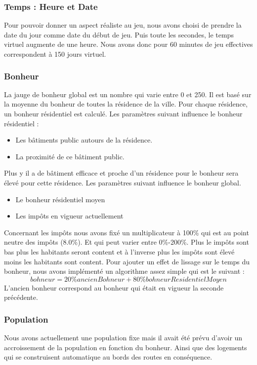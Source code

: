 \documentclass[a4paper,10pt,openany,oneside]{report}
\begin{document}
\subsubsection{Temps : Heure et Date}
Pour pouvoir donner un aspect réaliste au jeu, nous avons choisi de prendre la date du jour comme date du début de jeu. Puis toute les secondes, le temps virtuel augmente de une heure. Nous avons donc pour 60 minutes de jeu effectives correspondent à 150 jours virtuel.

\subsubsection{Bonheur}
La jauge de bonheur global est un nombre qui varie entre 0 et 250. Il est basé sur la moyenne du bonheur de toutes la résidence de la ville. 
\newline
Pour chaque résidence, un bonheur résidentiel est calculé.
Les paramètres suivant influence le bonheur résidentiel :
\begin{itemize}
	\item Les bâtiments public autours de la résidence.
	\item La proximité de ce bâtiment public.
\end{itemize}
Plus y il a de bâtiment efficace et proche d'un résidence pour le bonheur sera élevé pour cette résidence.
Les paramètres suivant influence le bonheur global.
\begin{itemize}
	\item Le bonheur résidentiel moyen
	\item Les impôts en vigueur actuellement
\end{itemize}
Concernant les impôts nous avons fixé un multiplicateur à 100\% qui est au point neutre des impôts (8.0\%). Et qui peut varier entre 0\%-200\%. Plus le impôts sont bas plus les habitants seront content et à l'inverse plus les impôts sont élevé moins les habitants sont content.
\newline
Pour ajouter un effet de lissage sur le temps du bonheur, nous avons implémenté un algorithme assez simple qui est le suivant :
\[bohneur = 20\% ancienBohneur + 80\% bohneurResidentielMoyen\]
L'ancien bonheur correspond au bonheur qui était en vigueur la seconde précédente.

\subsubsection{Population}
Nous avons actuellement une population fixe mais il avait été prévu d'avoir un accroissement de la population en fonction du bonheur. Ainsi que des logements qui se construisent automatique au bords des routes en conséquence.
\end{document}
